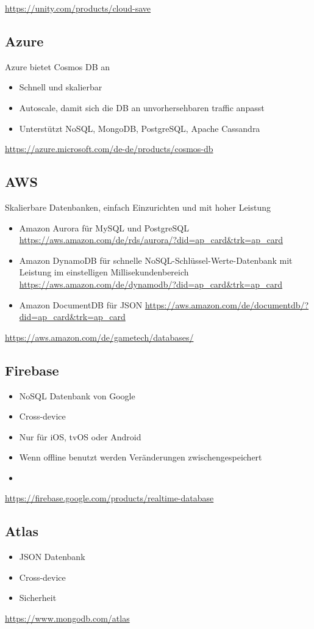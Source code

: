 \url{https://unity.com/products/cloud-save}

\subsection{Azure}
Azure bietet Cosmos DB an \\
\begin{itemize}
    \item Schnell und skalierbar
    \item Autoscale, damit sich die DB an unvorhersehbaren traffic anpasst
    \item Unterstützt NoSQL, MongoDB, PostgreSQL, Apache Cassandra
\end{itemize}
\url{https://azure.microsoft.com/de-de/products/cosmos-db}

\subsection{AWS}
Skalierbare Datenbanken, einfach Einzurichten und mit hoher Leistung
\begin{itemize}
    \item Amazon Aurora für MySQL und PostgreSQL \url{https://aws.amazon.com/de/rds/aurora/?did=ap_card&trk=ap_card}
    \item Amazon DynamoDB für schnelle NoSQL-Schlüssel-Werte-Datenbank mit Leistung im einstelligen Millisekundenbereich \url{https://aws.amazon.com/de/dynamodb/?did=ap_card&trk=ap_card}
    \item Amazon DocumentDB für JSON \url{https://aws.amazon.com/de/documentdb/?did=ap_card&trk=ap_card}
\end{itemize}

\url{https://aws.amazon.com/de/gametech/databases/}

\subsection{Firebase}

\begin{itemize}
    \item NoSQL Datenbank von Google
    \item Cross-device
    \item Nur für iOS, tvOS oder Android
    \item Wenn offline benutzt werden Veränderungen zwischengespeichert
    \item 
\end{itemize}

\url{https://firebase.google.com/products/realtime-database}

\subsection{Atlas}

\begin{itemize}
    \item JSON Datenbank
    \item Cross-device
    \item Sicherheit
\end{itemize}

\url{https://www.mongodb.com/atlas}